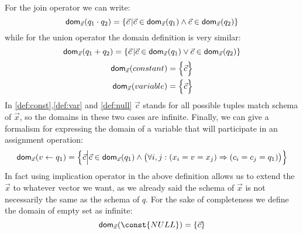 \documentclass[12pt]{article}
\begin{document}
For the join operator we can write:
\begin{equation}
\label{def:join}
\text{\textsf{dom}{}}_{\vec{x}}(q_{1}\cdot q_{2})=\{\vec{c}\,|\vec{c}\in\text{\textsf{dom}{}}_{\vec{x}}(q_{1})\land\vec{c}\in\text{\textsf{dom}{}}_{\vec{x}}(q_{2})\}
\end{equation}
while for the union operator the domain definition is very similar:
\begin{equation}
\label{def:plus}
\text{\textsf{dom}{}}_{\vec{x}}(q_{1}+ q_{2})=\{\vec{c}\,|\vec{c}\in\text{\textsf{dom}{}}_{\vec{x}}(q_{1})\lor\vec{c}\in\text{\textsf{dom}{}}_{\vec{x}}(q_{2})\}
\end{equation}
\begin{eqnarray}
\textsf{dom}{}_{\vec x}(constant)=\Big\{\vec c\Big\}\label{def:const}\\
\textsf{dom}{}_{\vec x}(variable)=\Big\{\vec c\Big\}\label{def:var}
\end{eqnarray}
In \eqref{def:const},\eqref{def:var} and \eqref{def:null} $\vec{c}$ stands for all possible tuples match schema of $\vec{x}$, so the domains in these two cases are infinite. 
Finally, we can give a formalism for expressing the domain of a variable that will participate in an assignment operation:
\begin{equation}
\label{assign2}
\text{\textsf{dom}{}}_{\vec{x}}(v\gets q_{1})=\Big\{\vec{c}\Big|\vec{c}\in\text{\textsf{dom}{}}_{\vec{x}}(q_{1})\land \big(\forall i,j: (x_{i}=v=x_{j})\Rightarrow(c_{i}=c_{j}=q_{1})\big)\Big\}
\end{equation}
In fact using implication operator in the above definition allows us to extend the $\vec{x}$ to whatever vector we want, as we already said the schema of $\vec{x}$ is not necessarily the same as the schema of $q$. %
For the sake of completeness we define the domain of empty set as infinite:
\begin{equation}
\label{def:null}
\text{\dom}_{\vec{x}}(\const{NULL})=\{\vec{c}\}
\end{equation}
\end{document}
